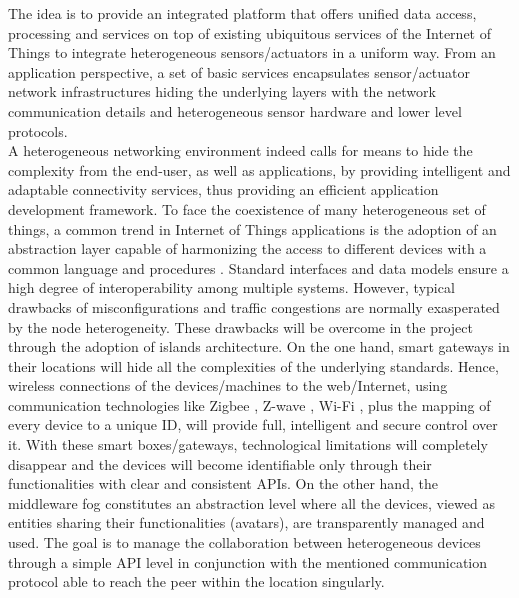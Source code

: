 The idea is to provide an integrated platform that offers unified data access, processing and services on top of existing ubiquitous services of the Internet of Things to integrate heterogeneous sensors/actuators in a uniform way. From an application perspective, a set of basic services encapsulates sensor/actuator network infrastructures hiding the underlying layers with the network communication details and heterogeneous sensor hardware and lower level protocols.\\

A heterogeneous networking environment indeed calls for means to hide the complexity from the end-user, as well as applications, by providing intelligent and adaptable connectivity services, thus providing an efficient application development framework. To face the coexistence of many heterogeneous set of things, a common trend in Internet of Things applications is the adoption of an abstraction layer capable of harmonizing the access to different devices with a common language and procedures \cite{ERA09}. Standard interfaces and data models ensure a high degree of interoperability among multiple systems. However, typical drawbacks of misconfigurations and traffic congestions are normally exasperated by the node heterogeneity. These drawbacks will be overcome in the project through the adoption of islands architecture. On the one hand, smart gateways in their locations will hide all the complexities of the underlying standards. Hence, wireless connections of the devices/machines to the web/Internet, using communication technologies like Zigbee \cite{Zigbee12}, Z-wave \cite{Zwave12}, Wi-Fi \cite{Wifi}, plus the mapping of every device to a unique ID, will provide full, intelligent and secure control over it. With these smart boxes/gateways, technological limitations will completely disappear and the devices will become identifiable only through their functionalities with clear and consistent APIs. On the other hand, the middleware fog constitutes an abstraction level where all the devices, viewed as entities sharing their functionalities (avatars), are transparently managed and used. The goal is to manage the collaboration between heterogeneous devices through a simple API level in conjunction with the mentioned communication protocol able to reach the peer within the location singularly.\\

